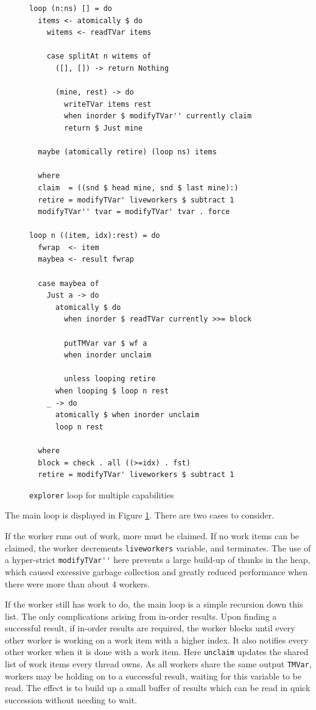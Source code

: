 \begin{figure}[t]
  \centering
  \begin{verbatim}
loop (n:ns) [] = do
  items <- atomically $ do
    witems <- readTVar items

    case splitAt n witems of
      ([], []) -> return Nothing

      (mine, rest) -> do
        writeTVar items rest
        when inorder $ modifyTVar'' currently claim
        return $ Just mine

  maybe (atomically retire) (loop ns) items

  where
  claim  = ((snd $ head mine, snd $ last mine):)
  retire = modifyTVar' liveworkers $ subtract 1
  modifyTVar'' tvar = modifyTVar' tvar . force

loop n ((item, idx):rest) = do
  fwrap  <- item
  maybea <- result fwrap

  case maybea of
    Just a -> do
      atomically $ do
        when inorder $ readTVar currently >>= block

        putTMVar var $ wf a
        when inorder unclaim

        unless looping retire
      when looping $ loop n rest
    _ -> do
      atomically $ when inorder unclaim
      loop n rest

  where
  block = check . all ((>=idx) . fst)
  retire = modifyTVar' liveworkers $ subtract 1
  \end{verbatim}
  \caption{\texttt{explorer} loop for multiple capabilities}
  \label{fig:searchparty-impl-explorern}
\end{figure}

The main loop is displayed in Figure
\ref{fig:searchparty-impl-explorern}. There are two cases to consider.

If the worker runs out of work, more must be claimed. If no work items
can be claimed, the worker decrements \verb|liveworkers| variable, and
terminates. The use of a hyper-strict \verb|modifyTVar''| here
prevents a large build-up of thunks in the heap, which caused
excessive garbage collection and greatly reduced performance when
there were more than about 4 workers.

If the worker still has work to do, the main loop is a simple
recursion down this list. The only complications arising from in-order
results. Upon finding a successful result, if in-order results are
required, the worker blocks until every other worker is working on a
work item with a higher index. It also notifies every other worker
when it is done with a work item. Here \verb|unclaim| updates the
shared list of work items every thread owns. As all workers share the
same output \verb|TMVar|, workers may be holding on to a successful
result, waiting for this variable to be read. The effect is to build
up a small buffer of results which can be read in quick succession
without needing to wait.

